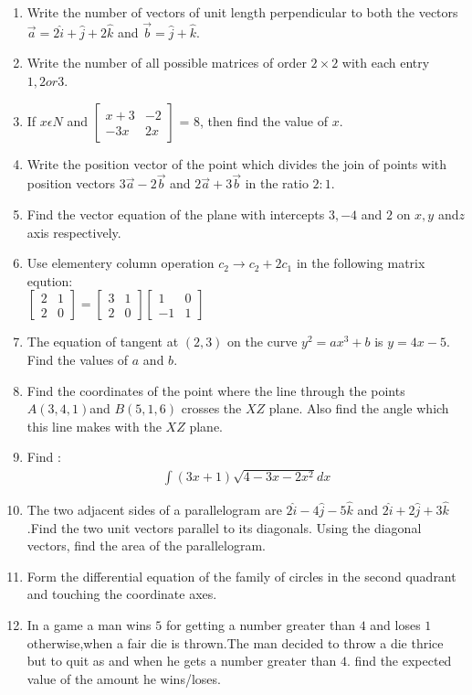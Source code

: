 \documentclass[12pt,-letter paper]{article}
\providecommand{\myvec}[1]{\ensuremath{\begin{bmatrix}#1\end{bmatrix}}}
\providecommand{\brak}[1]{\ensuremath{\left(#1\right)}}
\begin{document}
\begin{enumerate}
\item Write the number of vectors of unit length perpendicular to both the vectors $\overset{\rightarrow}{a} = 2\hat{i} + \hat{j} + 2\hat{k}$ and $\overset{\rightarrow}{b} = \hat{j} + \hat{k}$.
\item Write the number of all possible matrices of order $2\times2$ with each entry $1,2 or 3$.
\item If $x \epsilon  N$  and $\myvec{x+3 & -2 \\ -3x & 2x }$ = $8$,   then   find  the  value  of $ x$.
\item Write the position vector of the point which divides the join of points with position vectors $ 3\overset{\rightarrow} {a} - 2\overset{\rightarrow} {b} $ and $ 2\overset{\rightarrow}{a} + 3\overset{\rightarrow}{b} $ in the ratio $ 2:1 $.	
\item Find the vector equation of the plane with intercepts $3,-4$ and $2$ on $x,y$ and$z$ axis respectively.
\item Use elementery column operation $c_{2} \rightarrow c_{2}+2c_{1}$ in the following matrix eqution:\\ $\myvec{2 & 1 \\ 2 & 0}=\myvec{3 & 1 \\ 2 & 0}\myvec{1 & 0 \\ -1 & 1}$
\item The equation of tangent at $\brak{2,3}$ on the curve $y^2=ax^3+b$ is $y=4x-5$.  Find the values of $a$ and $b$.
\item Find the coordinates of the point where the line through the points $ A\brak{3,4,1} $and $B\brak{5,1,6}$ crosses the $XZ$ plane.  Also find the angle  which this line makes with the $XZ$ plane.
\item Find :\begin{align*} \int\brak{3x+1}\sqrt {4-3x-2x^2}dx \end{align*}
\item The two adjacent sides of a parallelogram are  $ 2\hat{i}-4\hat{j}-5\hat{k} $ and $2\hat{i}+2\hat{j}+3\hat{k} $.Find the two unit vectors parallel to its diagonals. Using the diagonal vectors, find the area of the parallelogram.	
\item Form the differential equation of the family of circles in the second quadrant and touching the coordinate axes.
\item In a game a man wins  \rupee$5$  for getting a number greater than $4$ and loses  \rupee $1$  otherwise,when a fair die is thrown.The man decided to throw a die thrice but to quit as and when he gets a number greater than $4$. find the expected value of the amount he wins/loses.

\end{enumerate}
\end{document}
